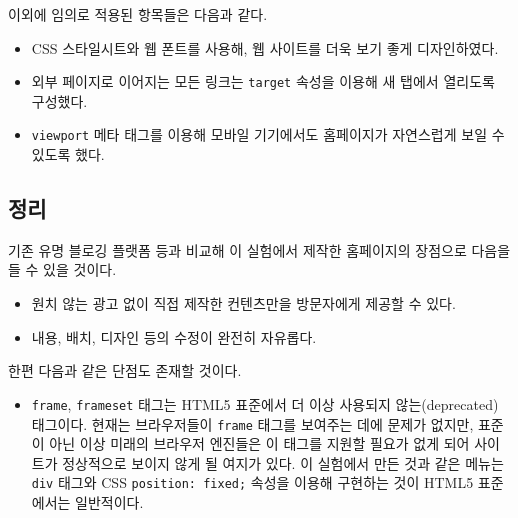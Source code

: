 \documentclass[runningheads]{llncs}
\begin{document}
이외에 임의로 적용된 항목들은 다음과 같다.
\begin{itemize}
	\item CSS 스타일시트와 웹 폰트를 사용해, 웹 사이트를 더욱 보기 좋게 디자인하였다.
	\item 외부 페이지로 이어지는 모든 링크는 \texttt{target} 속성을 이용해 새 탭에서 열리도록 구성했다.
	\item \texttt{viewport} 메타 태그를 이용해 모바일 기기에서도 홈페이지가 자연스럽게 보일 수 있도록 했다.
\end{itemize}

\subsection{정리}
기존 유명 블로깅 플랫폼 등과 비교해 이 실험에서 제작한 홈페이지의 장점으로 다음을 들 수 있을 것이다.
\begin{itemize}
	\item 원치 않는 광고 없이 직접 제작한 컨텐츠만을 방문자에게 제공할 수 있다.
	\item 내용, 배치, 디자인 등의 수정이 완전히 자유롭다.
\end{itemize}

한편 다음과 같은 단점도 존재할 것이다.
 \begin{itemize}
	\item \texttt{frame}, \texttt{frameset} 태그는 HTML5 표준에서 더 이상 사용되지 않는(deprecated) 태그이다. 현재는 브라우저들이 \texttt{frame} 태그를 보여주는 데에 문제가 없지만, 표준이 아닌 이상 미래의 브라우저 엔진들은 이 태그를 지원할 필요가 없게 되어 사이트가 정상적으로 보이지 않게 될 여지가 있다. 이 실험에서 만든 것과 같은 메뉴는 \texttt{div} 태그와 CSS \texttt{position: fixed;} 속성을 이용해 구현하는 것이 HTML5 표준에서는 일반적이다.
\end{itemize}
\end{document}
